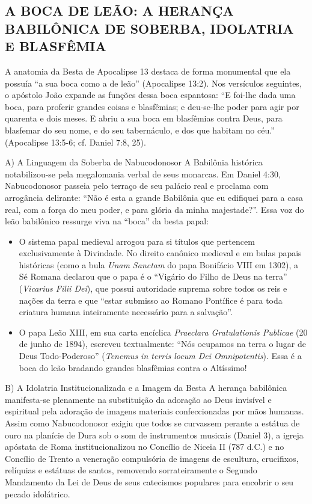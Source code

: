\documentclass[11pt,a4paper,openany]{book}
\begin{document}
\subsection{A BOCA DE LEÃO: A HERANÇA BABILÔNICA DE SOBERBA, IDOLATRIA E BLASFÊMIA}


A anatomia da Besta de Apocalipse 13 destaca de forma monumental que ela possuía ``a sua boca como a de leão'' (Apocalipse 13:2). Nos versículos seguintes, o apóstolo João expande as funções dessa boca espantosa:
``E foi-lhe dada uma boca, para proferir grandes coisas e blasfêmias; e deu-se-lhe poder para agir por quarenta e dois meses. E abriu a sua boca em blasfêmias contra Deus, para blasfemar do seu nome, e do seu tabernáculo, e dos que habitam no céu.'' (Apocalipse 13:5-6; cf. Daniel 7:8, 25).

A) A Linguagem da Soberba de Nabucodonosor
A Babilônia histórica notabilizou-se pela megalomania verbal de seus monarcas. Em Daniel 4:30, Nabucodonosor passeia pelo terraço de seu palácio real e proclama com arrogância delirante: ``Não é esta a grande Babilônia que eu edifiquei para a casa real, com a força do meu poder, e para glória da minha majestade?''. Essa voz do leão babilônico ressurge viva na ``boca'' da besta papal:
\begin{itemize}
  \item O sistema papal medieval arrogou para si títulos que pertencem exclusivamente à Divindade. No direito canônico medieval e em bulas papais históricas (como a bula \textit{Unam Sanctam} do papa Bonifácio VIII em 1302), a Sé Romana declarou que o papa é o ``Vigário do Filho de Deus na terra'' (\textit{Vicarius Filii Dei}), que possui autoridade suprema sobre todos os reis e nações da terra e que ``estar submisso ao Romano Pontífice é para toda criatura humana inteiramente necessário para a salvação''.
  \item O papa Leão XIII, em sua carta encíclica \textit{Praeclara Gratulationis Publicae} (20 de junho de 1894), escreveu textualmente: ``Nós ocupamos na terra o lugar de Deus Todo-Poderoso'' (\textit{Tenemus in terris locum Dei Omnipotentis}). Essa é a boca do leão bradando grandes blasfêmias contra o Altíssimo!
\end{itemize}


B) A Idolatria Institucionalizada e a Imagem da Besta
A herança babilônica manifesta-se plenamente na substituição da adoração ao Deus invisível e espiritual pela adoração de imagens materiais confeccionadas por mãos humanas. Assim como Nabucodonosor exigiu que todos se curvassem perante a estátua de ouro na planície de Dura sob o som de instrumentos musicais (Daniel 3), a igreja apóstata de Roma institucionalizou no Concílio de Niceia II (787 d.C.) e no Concílio de Trento a veneração compulsória de imagens de escultura, crucifixos, relíquias e estátuas de santos, removendo sorrateiramente o Segundo Mandamento da Lei de Deus de seus catecismos populares para encobrir o seu pecado idolátrico.
\end{document}
